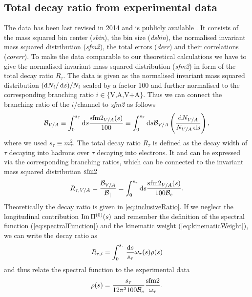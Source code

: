 \documentclass[../../index.tex]{subfiles}
\begin{document}
\subsection{Total decay ratio from experimental data}
The data has been last revised in 2014 \cite{Davier2013} and is publicly
available \cite{AlephData}. It consists of the mass squared bin center
(\textit{sbin}), the bin size (\textit{dsbin}), the normalised invariant mass
squared distribution (\textit{sfm2}), the total errors (\textit{derr}) and their
correlations (\textit{corerr}). To make the data comparable to our theoretical
calculations we have to give the normalised invariant mass squared distribution
(\textit{sfm2}) in form of the total decay ratio \(R_\tau\). The data is given
as the normalised invariant mass squared distribution \((\dif N_i/\dif s)/N_i\)
scaled by a factor \(100\) and further normalised to the corresponding branching
ratio \(i\in\{\text{V,A,V+A}\}\). Thus we can connect the branching ratio of the
\(i\)\-/channel to \textit{sfm2} as follows
\begin{equation}
  \mathcal{B}_{V/A} \equiv \int_0^{s_\tau} \dif s \frac{\sfm2_{V/A}(s)}{100}
  \equiv \int_0^{s_\tau} \dif s \mathcal{B}_{V/A}
  \left( \frac{\dif N_{V/A}}{N_{V/A}\dif s} \right),
\end{equation}
where we used \(s_\tau \equiv m_\tau^2\). The total decay ratio \(R_\tau\) is
defined as the decay width of \(\tau\) decaying into hadrons over \(\tau\)
decaying into electrons. It and can be expressed via the corresponding branching
ratios, which can be connected to the invariant mass squared distribution
\(\sfm2\)
\begin{equation}
  R_{\tau, V/A} = \frac{\mathcal{B}_{V/A}}{\mathcal{B_e}}
  = \int_0^{s_\tau} \dif s \frac{\sfm2_{V/A}(s)}{100 \mathcal{B}_e}.
\end{equation}
Theoretically the decay ratio is given in \cref{eq:inclusiveRatio}. If we
neglect the longitudinal contribution \(\operatorname{Im} \Pi^{(0)}(s)\) and remember the
definition of the spectral function (\cref{eq:spectralFunction}) and the
kinematic weight (\cref{eq:kinematicWeight}), we can write the decay ratio as
\begin{equation}
  R_{\tau, i} = \int_0^{s_\tau} \frac{\dif s}{s_\tau} \omega_\tau(s) \rho(s)
\end{equation}
and thus relate the spectral function to the experimental data
\begin{equation}
  \rho(s) = \frac{s_\tau}{12 \pi^2 100 \mathcal{B}_e} \frac{\sfm2}{\omega_\tau}.
\end{equation}
\end{document}
